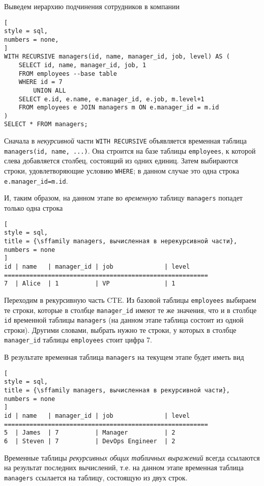 \documentclass[%
	11pt,
	a4paper,
	utf8,
		]{article}
\begin{document}
Выведем иерархию подчинения сотрудников в компании

\begin{lstlisting}[
style = sql,
numbers = none,
]
WITH RECURSIVE managers(id, name, manager_id, job, level) AS (
    SELECT id, name, manager_id, job, 1
    FROM employees --base table
    WHERE id = 7
        UNION ALL
    SELECT e.id, e.name, e.manager_id, e.job, m.level+1
    FROM employees e JOIN managers m ON e.manager_id = m.id
)
SELECT * FROM managers;
\end{lstlisting}

Сначала в \emph{некурсивной} части \texttt{WITH RECURSIVE} объявляется временная таблица \texttt{managers(id, name, ...)}. Она строится на базе таблицы \texttt{employees}, к которой слева добавляется столбец, состоящий из одних единиц. Затем выбираются строки, удовлетворяющие условию \texttt{WHERE}; в данном случае это одна строка \texttt{e.manager\_id=m.id}.

И, таким образом, на данном этапе во \emph{временную} таблицу \texttt{managers} попадет только одна строка
\begin{lstlisting}[
style = sql,
title = {\sffamily managers, вычисленная в нерекурсивной части},
numbers = none
]
id | name   | manager_id | job              | level
========================================================
7  | Alice  | 1          | VP               | 1
\end{lstlisting}

Переходим в рекурсивную часть CTE. Из базовой таблицы \texttt{employees} выбираем те строки, которые в столбце \texttt{manager\_id} имеют те же значения, что и в столбце \texttt{id} временной таблицы \texttt{managers} (на данном этапе таблица состоит из одной строки). Другими словами, выбрать нужно те строки, у которых в столбце \texttt{manager\_id} таблицы \texttt{employees} стоит цифра 7.

В результате временная таблица \texttt{managers} на текущем этапе будет иметь вид

\begin{lstlisting}[
style = sql,
title = {\sffamily managers, вычисленная в рекурсивной части},
numbers = none
]
id | name   | manager_id | job              | level
========================================================
5  | James  | 7          | Manager          | 2
6  | Steven | 7          | DevOps Engineer  | 2
\end{lstlisting}

Временные таблицы \emph{рекурсивных общих табличных выражений} всегда ссылаются на результат последних вычислений, т.е. на данном этапе временная таблица \texttt{managers} ссылается на таблицу, состоящую из двух строк.
\end{document}
